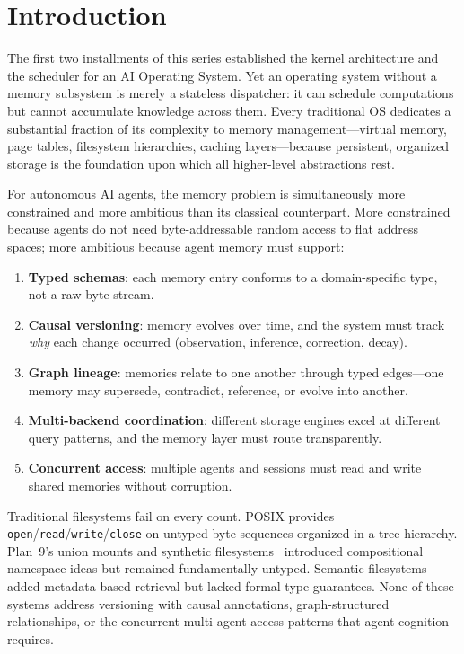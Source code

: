 \documentclass[12pt,a4paper]{article}
\theoremstyle{definition}
\begin{document}
\setcounter{tocdepth}{2}
\tableofcontents
\newpage

\section{Introduction}\label{sec:introduction}

The first two installments of this series established the kernel architecture and the scheduler for an AI Operating System.
Yet an operating system without a memory subsystem is merely a stateless dispatcher: it can schedule computations but cannot accumulate knowledge across them.
Every traditional OS dedicates a substantial fraction of its complexity to memory management---virtual memory, page tables, filesystem hierarchies, caching layers---because persistent, organized storage is the foundation upon which all higher-level abstractions rest.

For autonomous AI agents, the memory problem is simultaneously more constrained and more ambitious than its classical counterpart.
More constrained because agents do not need byte-addressable random access to flat address spaces; more ambitious because agent memory must support:

\begin{enumerate}[label=(\roman*)]
  \item \textbf{Typed schemas}: each memory entry conforms to a domain-specific type, not a raw byte stream.
  \item \textbf{Causal versioning}: memory evolves over time, and the system must track \emph{why} each change occurred (observation, inference, correction, decay).
  \item \textbf{Graph lineage}: memories relate to one another through typed edges---one memory may supersede, contradict, reference, or evolve into another.
  \item \textbf{Multi-backend coordination}: different storage engines excel at different query patterns, and the memory layer must route transparently.
  \item \textbf{Concurrent access}: multiple agents and sessions must read and write shared memories without corruption.
\end{enumerate}

Traditional filesystems fail on every count.
POSIX provides \texttt{open}/\texttt{read}/\texttt{write}/\texttt{close} on untyped byte sequences organized in a tree hierarchy.
Plan~9's union mounts and synthetic filesystems~\citep{pike1995plan9} introduced compositional namespace ideas but remained fundamentally untyped.
Semantic filesystems~\citep{gifford1991semantic} added metadata-based retrieval but lacked formal type guarantees.
None of these systems address versioning with causal annotations, graph-structured relationships, or the concurrent multi-agent access patterns that agent cognition requires.
\end{document}
